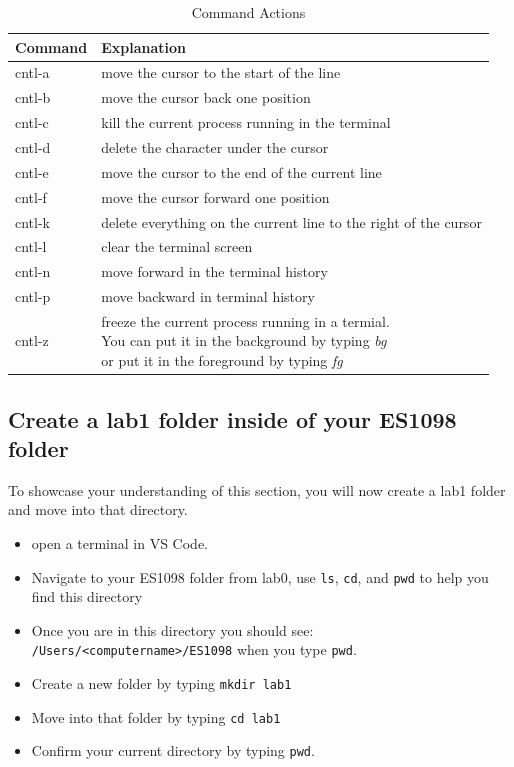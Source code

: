 \documentclass[12pt]{article}
\begin{document}
\begin{table}[h]
  \centering
  \begin{tabular}{| l | l | }
    \hline
    \textbf{Command} & \textbf{Explanation} \\ \hline
    cntl-a & move the cursor to the start of the line \\ \hline
    cntl-b & move the cursor back one position \\ \hline
    cntl-c & kill the current process running in the terminal \\ \hline
    cntl-d & delete the character under the cursor \\ \hline
    cntl-e & move the cursor to the end of the current line \\ \hline
    cntl-f & move the cursor forward one position \\ \hline
    cntl-k & delete everything on the current line to the right of the cursor \\ \hline
    cntl-l & clear the terminal screen \\ \hline
    cntl-n & move forward in the terminal history \\ \hline
    cntl-p & move backward in terminal history \\ \hline
    cntl-z & \shortstack[l]{freeze the current process running in a termial. \\ You can put it in the background by typing \textit{bg} \\or put it in the foreground by typing \textit{fg}}\\ \hline
  \end{tabular}
  \caption{Command Actions}
  \label{table:command_action}
\end{table}

\subsection{Create a lab1 folder inside of your ES1098 folder}
To showcase your understanding of this section, you will now create a lab1 folder and move into that directory. 
\begin{itemize}
  \item open a terminal in VS Code. 
  \item Navigate to your ES1098 folder from lab0, use \texttt{ls}, \texttt{cd}, and \texttt{pwd} to help you find this directory
  \item Once you are in this directory you should see: \texttt{/Users/<computername>/ES1098} when you type \texttt{pwd}.
  \item Create a new folder by typing \texttt{mkdir lab1}
  \item Move into that folder by typing \texttt{cd lab1}
  \item Confirm your current directory by typing \texttt{pwd}.
\end{itemize}
\end{document}
